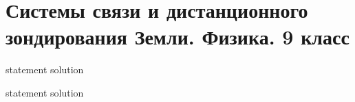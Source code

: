 \chapter{Системы связи и дистанционного зондирования Земли. Физика. 9 класс}

{statement}
{solution}

{statement}
{solution}